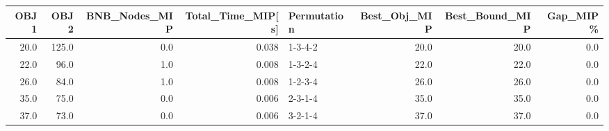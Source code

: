 \begin{tabular}{rrrrlrrr}
\toprule
 OBJ1 &   OBJ2 &  BNB\_Nodes\_MIP &  Total\_Time\_MIP[s] & Permutation &  Best\_Obj\_MIP &  Best\_Bound\_MIP &  Gap\_MIP\% \\
\midrule
 20.0 &  125.0 &            0.0 &              0.038 &     1-3-4-2 &          20.0 &            20.0 &       0.0 \\
 22.0 &   96.0 &            1.0 &              0.008 &     1-3-2-4 &          22.0 &            22.0 &       0.0 \\
 26.0 &   84.0 &            1.0 &              0.008 &     1-2-3-4 &          26.0 &            26.0 &       0.0 \\
 35.0 &   75.0 &            0.0 &              0.006 &     2-3-1-4 &          35.0 &            35.0 &       0.0 \\
 37.0 &   73.0 &            0.0 &              0.006 &     3-2-1-4 &          37.0 &            37.0 &       0.0 \\
\bottomrule
\end{tabular}

